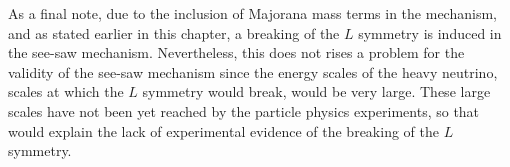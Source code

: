 As a final note, due to the inclusion of Majorana mass terms in the mechanism, and as stated earlier in this chapter, a breaking of the $L$ symmetry is induced in the see-saw mechanism. Nevertheless, this does not rises a problem for the validity of the see-saw mechanism since the energy scales of the heavy neutrino, scales at which the $L$ symmetry would break, would be very large. These large scales have not been yet reached by the particle physics experiments, so that would explain the lack of experimental evidence of the breaking of the $L$ symmetry.












 


